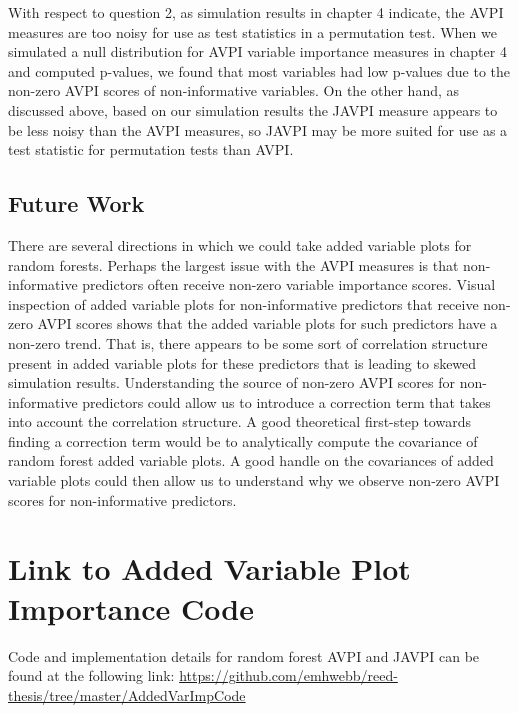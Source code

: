 \documentclass[12pt,twoside]{reedthesis}
\theoremstyle{definition}
\theoremstyle{definition}
\theoremstyle{definition}
\theoremstyle{remark}
\begin{document}
With respect to question 2, as simulation results in chapter 4 indicate,
the AVPI measures are too noisy for use as test statistics in a
permutation test. When we simulated a null distribution for AVPI
variable importance measures in chapter 4 and computed p-values, we
found that most variables had low p-values due to the non-zero AVPI
scores of non-informative variables. On the other hand, as discussed
above, based on our simulation results the JAVPI measure appears to be
less noisy than the AVPI measures, so JAVPI may be more suited for use
as a test statistic for permutation tests than AVPI. \par 

\section{Future Work}\label{future-work}

There are several directions in which we could take added variable plots
for random forests. Perhaps the largest issue with the AVPI measures is
that non-informative predictors often receive non-zero variable
importance scores. Visual inspection of added variable plots for
non-informative predictors that receive non-zero AVPI scores shows that
the added variable plots for such predictors have a non-zero trend. That
is, there appears to be some sort of correlation structure present in
added variable plots for these predictors that is leading to skewed
simulation results. Understanding the source of non-zero AVPI scores for
non-informative predictors could allow us to introduce a correction term
that takes into account the correlation structure. A good theoretical
first-step towards finding a correction term would be to analytically
compute the covariance of random forest added variable plots. A good
handle on the covariances of added variable plots could then allow us to
understand why we observe non-zero AVPI scores for non-informative
predictors. \par

\appendix

\chapter{Link to Added Variable Plot Importance
Code}\label{link-to-added-variable-plot-importance-code}

Code and implementation details for random forest AVPI and JAVPI can be
found at the following link:
\url{https://github.com/emhwebb/reed-thesis/tree/master/AddedVarImpCode}
\end{document}
